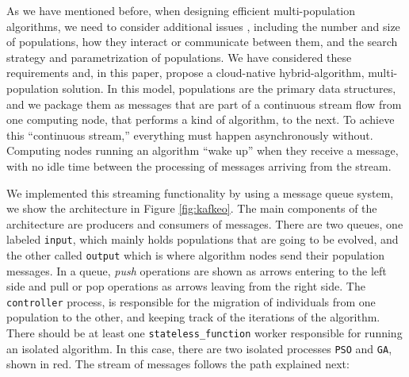\documentclass[runningheads]{llncs}
\begin{document}
As we have mentioned before, when designing efficient multi-population
algorithms, we need to consider additional issues \cite{Ma2019},
including the number and size of populations, how they interact or
communicate between them, and the search strategy and parametrization
of populations. We have considered these requirements and, in this
paper, propose a cloud-native hybrid-algorithm, multi-population
solution. In this model, populations are the primary data structures,
and we package them as messages that are part of a continuous stream
flow from one computing node, that performs a kind of algorithm, to
the next. To achieve this ``continuous stream,'' everything must
happen asynchronously without. Computing nodes running an algorithm
``wake up'' when they receive a message, with no idle time between the
processing of messages arriving from the stream.

We implemented this streaming functionality by using a message
queue system, we show the architecture in Figure
\ref{fig:kafkeo}. The main components of the architecture are 
producers and consumers of messages. There are two queues, one labeled
\texttt{input}, which mainly holds populations that are going to be
evolved, and the other called \texttt{output} which is where algorithm
nodes send their population messages. In a queue, {\em push}
operations are shown as arrows entering to the left side
and pull or pop operations as arrows leaving from the right
side. The \texttt{controller} process, is responsible for the
migration of individuals from one population to the other, and keeping
track of the iterations of the algorithm. There should be at least one
\texttt{stateless\_function} worker responsible for running an isolated algorithm.
In this case, there are two isolated processes \texttt{PSO} and \texttt{GA},
shown in red. The stream of messages follows the path explained next:
\end{document}
